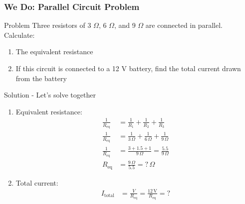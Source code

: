 \documentclass{beamer}
\begin{document}
\begin{frame}
    \frametitle{We Do: Parallel Circuit Problem}
    \begin{block}{Problem}
        Three resistors of 3 $\Omega$, 6 $\Omega$, and 9 $\Omega$ are connected in parallel. Calculate:
        \begin{enumerate}
            \item The equivalent resistance
            \item If this circuit is connected to a 12 V battery, find the total current drawn from the battery
        \end{enumerate}
    \end{block}
    \end{frame}

\begin{frame}
    \begin{block}{Solution - Let's solve together}
        \begin{enumerate}
            \item Equivalent resistance:
            \begin{align}
                \frac{1}{R_{\text{eq}}} &= \frac{1}{R_1} + \frac{1}{R_2} + \frac{1}{R_3} \\
                \frac{1}{R_{\text{eq}}} &= \frac{1}{3\,\Omega} + \frac{1}{6\,\Omega} + \frac{1}{9\,\Omega} \\
                \frac{1}{R_{\text{eq}}} &= \frac{3 + 1.5 + 1}{9\,\Omega} = \frac{5.5}{9\,\Omega} \\
                R_{\text{eq}} &= \frac{9\,\Omega}{5.5} = ? \,\Omega
            \end{align}
            
            \item Total current:
            \begin{align}
                I_{\text{total}} &= \frac{V}{R_{\text{eq}}} = \frac{12\,\text{V}}{R_{\text{eq}}} = ?
            \end{align}
        \end{enumerate}
    \end{block}
\end{frame}
\end{document}
